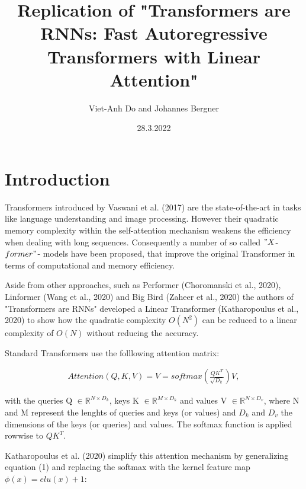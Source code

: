 \documentclass[DIV=13,fontsize=11pt]{scrartcl}
\title{Replication of "Transformers are RNNs: Fast Autoregressive Transformers with Linear Attention"}
\author{Viet-Anh Do and Johannes Bergner}
\date{28.3.2022}
\begin{document}
\maketitle
\section{Introduction}

Transformers introduced by Vaswani et al. (2017) are the state-of-the-art in  tasks like language understanding and image processing.  However their quadratic memory complexity within the self-attention mechanism weakens the efficiency when dealing with long sequences.  
Consequently a number of so called \("X\)-\(former"\)- models have been proposed, that improve the original Transformer in terms of computational and memory efficiency.

Aside from other approaches, such as Performer (Choromanski et al., 2020), Linformer (Wang et al., 2020) and Big Bird (Zaheer et al., 2020) the authors of "Transformers are RNNs" developed a Linear Transformer (Katharopoulus et al., 2020) to show how the quadratic complexity \(O(N^2)\)  can be reduced to a linear complexity of \(O(N)\) without reducing the accuracy.

Standard Transformers use the folllowing attention matrix:

\begin{align}
    Attention(Q, K, V) {=} V {=} softmax \left(\frac {QK^T}{\sqrt{D_{k}}}\right) V,
\end{align}

with the queries Q \( \in \mathbb{R}^{N \times D_{k}}\),  keys K \(\in \mathbb{R}^{M \times D_{k}}\) and values V \( \in \mathbb{R}^{N \times D_{v}}\), where N and M represent the lenghts of queries and keys (or values) and \(D_{k}\) and \(D_{v}\) the dimensions of the keys (or queries) and values. The softmax function is applied rowwise to \(QK^T\).

Katharopoulus et al. (2020) simplify this attention mechanism by generalizing equation (1) and replacing the softmax with the kernel feature map \(\phi (x) {=} elu(x) +1\):
\end{document}
